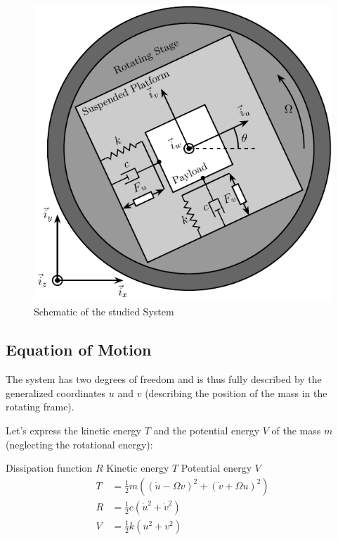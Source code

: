 \documentclass{ISMA_USD2020}
\begin{document}
\begin{figure}[htbp]
\centering
\includegraphics[scale=1]{figs/system.pdf}
\caption{\label{fig:system}Schematic of the studied System}
\end{figure}


\subsection{Equation of Motion}
\label{sec:org9612ace}
The system has two degrees of freedom and is thus fully described by the generalized coordinates \(u\) and \(v\) (describing the position of the mass in the rotating frame).

Let's express the kinetic energy \(T\) and the potential energy \(V\) of the mass \(m\) (neglecting the rotational energy):

Dissipation function \(R\)
Kinetic energy \(T\)
Potential energy \(V\)
\begin{subequations}
  \begin{align}
    T & = \frac{1}{2} m \left( \left( \dot{u} - \Omega v \right)^2 + \left( \dot{v} + \Omega u \right)^2 \right) \\
    R & = \frac{1}{2} c \left( \dot{u}^2 + \dot{v}^2 \right) \\
    V & = \frac{1}{2} k \left( u^2 + v^2 \right)
  \end{align}
\end{subequations}
\end{document}
